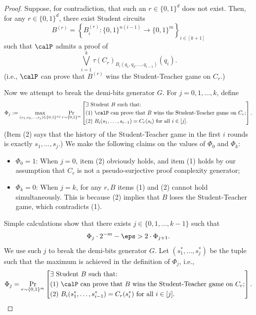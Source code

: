 \begin{proof}
    Suppose, for contradiction, that such an $r\in \{0,1\}^d$ does not exist. Then, for any $r\in\{0,1\}^d$, there exist Student circuits
    \[
        B^{(r)}=\left\{B_i^{(r)}\colon \{0,1\}^{n(i-1)}\to\{0,1\}^m\right\}_{i\in[k+1]}
    \]
    such that $\calP$ admits a proof of
    \[
        \bigvee_{i=1}^k\tau(C_r)_{B_{i}(q_1,q_2,\dots,q_{i-1})}(q_i).
    \]
    (i.e., $\calP$ can prove that $B^{(r)}$ wins the Student-Teacher game on $C_r$.)

    Now we attempt to break the demi-bits generator $G$. For $j=0,1,\dots,k$, define
    \[
        \Phi_j:=\max_{(s_1,s_2,\dots,s_j)\in\{0,1\}^{nj}}\Pr_{r\sim\{0,1\}^m}\left[\begin{aligned}
            &\text{$\exists$ Student $B$ such that:}\\
            &\text{(1) $\calP$ can prove that $B$ wins the Student-Teacher game on $C_r$;}\\
            &\text{(2) $B_i(s_1,\dots,s_{i-1})=C_r(s_i)$ for all $i\in[j]$.}
        \end{aligned}\right].
    \]
    (Item (2) says that the history of the Student-Teacher game in the first $i$ rounds is exactly $s_1,\dots,s_j$.) We make the following claims on the values of $\Phi_0$ and $\Phi_k$:
    \begin{itemize}
        \item $\Phi_0=1$: When $j=0$, item (2) obviously holds, and item (1) holds by our assumption that $C_r$ is not a pseudo-surjective proof complexity generator;
        \item $\Phi_k=0$: When $j=k$, for any $r,B$ items (1) and (2) cannot hold simultaneously. This is because (2) implies that $B$ loses the Student-Teacher game, which contradicts (1).
    \end{itemize}\par
    Simple calculations show that there exists $j\in\{0,1,\dots,k-1\}$ such that 
    \[
        \Phi_j\cdot 2^{-m}-\eps>2\cdot\Phi_{j+1}.
    \]
    We use such $j$ to break the demi-bits generator $G$. Let $(s_1^*,\dots,s_j^*)$ be the tuple such that the maximum is achieved in the definition of $\Phi_j$, i.e.,
    \[
        \Phi_j=\Pr_{r\sim\{0,1\}^m}\left[\begin{aligned}
            &\text{$\exists$ Student $B$ such that:}\\
            &\text{(1) $\calP$ can prove that $B$ wins the Student-Teacher game on $C_r$;}\\
            &\text{(2) $B_i(s_1^*,\dots,s_{i-1}^*)=C_r(s_{i}^*)$ for all $i\in[j]$.}
        \end{aligned}\right].
    \]
    

\end{proof}
